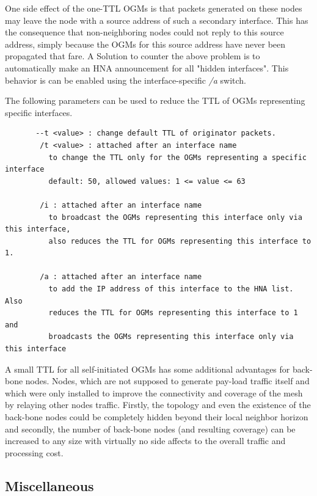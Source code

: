 \documentclass[11pt]{article}
\begin{document}
One side effect of the one-TTL OGMs is that packets generated on these nodes may leave the node with a source address of such a secondary interface.
%
This has the consequence that non-neighboring nodes could not reply to this source address, simply because the OGMs for this source address have never been propagated that fare.
A Solution to counter the above problem is to automatically make an HNA announcement for all "hidden interfaces".
This behavior is can be enabled using the interface-specific \emph{/a} switch.

The following parameters can be used to reduce the TTL of OGMs representing specific interfaces.

\begin{small} \begin{verbatim}
       --t <value> : change default TTL of originator packets.
        /t <value> : attached after an interface name
          to change the TTL only for the OGMs representing a specific interface
          default: 50, allowed values: 1 <= value <= 63

        /i : attached after an interface name
          to broadcast the OGMs representing this interface only via this interface,
          also reduces the TTL for OGMs representing this interface to 1.

        /a : attached after an interface name
          to add the IP address of this interface to the HNA list. Also
          reduces the TTL for OGMs representing this interface to 1 and
          broadcasts the OGMs representing this interface only via this interface
\end{verbatim} \end{small}

A small TTL for all self-initiated OGMs has some additional advantages for back-bone nodes. Nodes, which are not supposed to generate pay-load traffic itself and which were only installed to improve the connectivity and coverage of the mesh by relaying other nodes traffic.
%
Firstly, the topology and even the existence of the back-bone nodes could be completely hidden beyond their local neighbor horizon and secondly, the number of back-bone nodes (and resulting coverage) can be increased to any size with virtually no side affects to the overall traffic and processing cost.


\subsection{Miscellaneous}
\end{document}
